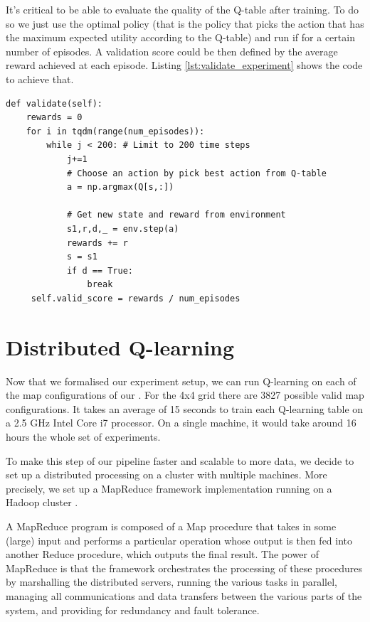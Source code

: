 It's critical to be able to evaluate the quality of the Q-table after training. To do so we just use the optimal policy (that is the policy that picks the action that has the maximum expected utility according to the Q-table) and run if for a certain number of episodes. A validation score could be then defined by the average reward achieved at each episode. Listing \ref{lst:validate_experiment} shows the code to achieve that.

\begin{minipage}{\linewidth}
\lstset{language=Python}
\lstset{frame=lines}
\lstset{basicstyle=\footnotesize}
\begin{lstlisting}
def validate(self):
	rewards = 0
    for i in tqdm(range(num_episodes)):
        while j < 200: # Limit to 200 time steps
            j+=1
            # Choose an action by pick best action from Q-table
            a = np.argmax(Q[s,:])
            
            # Get new state and reward from environment
            s1,r,d,_ = env.step(a)
            rewards += r
            s = s1
            if d == True:
                break
     self.valid_score = rewards / num_episodes
\end{lstlisting}
\end{minipage}


\section{Distributed Q-learning}
Now that we formalised our experiment setup, we can run Q-learning on each of the map configurations of our . For the 4x4 grid there are 3827 possible valid map configurations. It takes an average of 15 seconds to train each Q-learning table on a 2.5 GHz Intel Core i7 processor. On a single machine, it would take around 16 hours the whole set of experiments.

To make this step of our pipeline faster and scalable to more data, we decide to set up a distributed processing on a cluster with multiple machines. More precisely, we set up a MapReduce framework \parencite{Dean:2004:MSD:1251254.1251264} implementation running on a Hadoop cluster \parencite{shvachko2010hadoop}.

A MapReduce program is composed of a Map procedure that takes in some (large) input and performs a particular operation whose output is then fed into another Reduce procedure, which outputs the final result. The power of MapReduce is that the framework orchestrates the processing of these procedures by marshalling the distributed servers, running the various tasks in parallel, managing all communications and data transfers between the various parts of the system, and providing for redundancy and fault tolerance.

